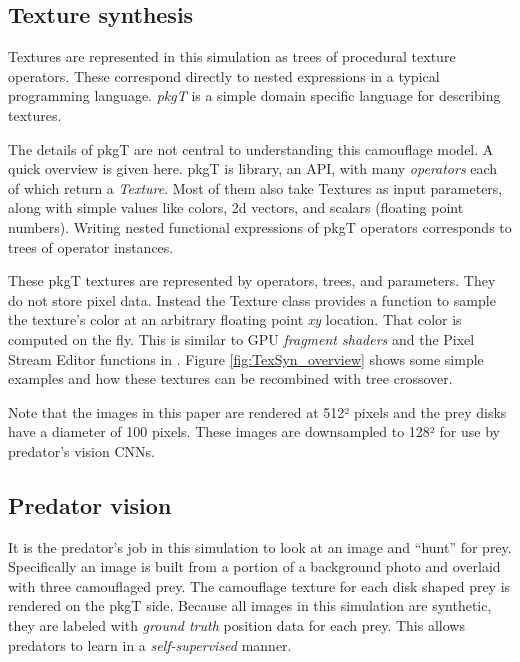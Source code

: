 \documentclass[acmtog]{acmart}
\newcommand{\jargon}[1]{\textit{#1}}
\newcommand{\texsyn}[0]{pkgT}
\begin{document}
\subsection{Texture synthesis}
\label{subsec:texture_synthesis}
Textures are represented in this simulation as trees of procedural texture operators. These correspond directly to nested expressions in a typical programming language. \jargon{\texsyn{}} is a simple domain specific language for describing textures.
\par
The details of \texsyn{} are not central to understanding this camouflage model. A quick overview is given here. \texsyn{} is library, an API, with many \jargon{operators} each of which return a \jargon{Texture}. Most of them also take Textures as input parameters, along with simple values like colors, 2d vectors, and scalars (floating point numbers). Writing nested functional expressions of \texsyn{} operators corresponds to trees of operator instances.
\par
These \texsyn{} textures are represented by operators, trees, and parameters. They do not store pixel data. Instead the Texture class provides a function to sample the texture's color at an arbitrary floating point \textit{xy} location. That color is computed on the fly. This is similar to GPU \jargon{fragment shaders} and the Pixel Stream Editor functions in \citet{perlin_image_1985}. Figure \ref{fig:TexSyn_overview} shows some simple examples and how these textures can be recombined with tree crossover.
\par
Note that the images in this paper are rendered at 512² pixels and the prey disks have a diameter of 100 pixels. These images are downsampled to 128² for use by predator's vision CNNs.
\par


\subsection{Predator vision}
It is the predator's job in this simulation to look at an image and “hunt” for prey. Specifically an image is built from a portion of a background photo and overlaid with three camouflaged prey. The camouflage texture for each disk shaped prey is rendered on the \texsyn{} side. Because all images in this simulation are synthetic, they are labeled with \jargon{ground truth} position data for each prey. This allows predators to learn in a \jargon{self-supervised} manner.
\par
\end{document}
